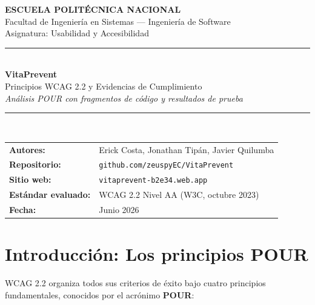 \documentclass[12pt, a4paper]{article}
\begin{document}
\begin{titlepage}
\centering
\vspace*{2cm}
{\Large\bfseries\color{navydeep} ESCUELA POLITÉCNICA NACIONAL}\\[4pt]
{\normalsize Facultad de Ingeniería en Sistemas --- Ingeniería de Software}\\[4pt]
{\normalsize Asignatura: Usabilidad y Accesibilidad}\\[2cm]
{\color{royalblue}\rule{0.8\linewidth}{1.5pt}}\\[1cm]
{\Huge\bfseries\color{navydeep} VitaPrevent}\\[0.5cm]
{\Large\color{royalblue} Principios WCAG 2.2 y Evidencias de Cumplimiento}\\[0.3cm]
{\large\itshape Análisis POUR con fragmentos de código y resultados de prueba}\\[1cm]
{\color{royalblue}\rule{0.8\linewidth}{0.8pt}}\\[1.5cm]
\begin{tabular}{ll}
  \textbf{Autores:} & Erick Costa, Jonathan Tipán, Javier Quilumba \\
  \textbf{Repositorio:} & \texttt{github.com/zeuspyEC/VitaPrevent} \\
  \textbf{Sitio web:} & \texttt{vitaprevent-b2e34.web.app} \\
  \textbf{Estándar evaluado:} & WCAG 2.2 Nivel AA (W3C, octubre 2023) \\
  \textbf{Fecha:} & Junio 2026 \\
\end{tabular}
\end{titlepage}

\tableofcontents
\newpage

\section{Introducción: Los principios POUR}

WCAG 2.2 organiza todos sus criterios de éxito bajo cuatro principios fundamentales, conocidos por el acrónimo \textbf{POUR}:
\end{document}
